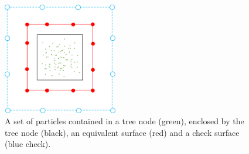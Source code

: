 \documentclass[12pt, a4, twoside]{article}
\begin{document}
\begin{figure}\label{app:fig:upward_surface}
\centering
\includegraphics[width=5cm]{upward_surface.png}
\caption{A set of particles contained in a tree node (green), enclosed by the tree node (black), an equivalent surface (red) and a check surface (blue check).}
\end{figure}
    
\printbibliography[heading=bibintoc]
\end{document}
